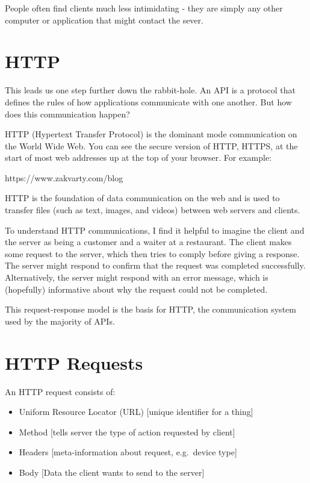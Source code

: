 \documentclass[
  12pt,
]{book}
\newenvironment{Shaded}{\begin{snugshade}}{\end{snugshade}}
\newcommand{\NormalTok}[1]{#1}
\providecommand{\tightlist}{%
  \setlength{\itemsep}{0pt}\setlength{\parskip}{0pt}}
\begin{document}
People often find clients much less intimidating - they are simply any other computer or application that might contact the sever.

\hypertarget{http}{%
\section{HTTP}\label{http}}

This leads us one step further down the rabbit-hole. An API is a protocol that defines the rules of how applications communicate with one another. But how does this communication happen?

HTTP (Hypertext Transfer Protocol) is the dominant mode communication on the World Wide Web. You can see the secure version of HTTP, HTTPS, at the start of most web addresses up at the top of your browser. For example:

\begin{Shaded}
\begin{Highlighting}[]
\NormalTok{https://www.zakvarty.com/blog}
\end{Highlighting}
\end{Shaded}

HTTP is the foundation of data communication on the web and is used to transfer files (such as text, images, and videos) between web servers and clients.

To understand HTTP communications, I find it helpful to imagine the client and the server as being a customer and a waiter at a restaurant. The client makes some request to the server, which then tries to comply before giving a response. The server might respond to confirm that the request was completed successfully. Alternatively, the server might respond with an error message, which is (hopefully) informative about why the request could not be completed.

This request-response model is the basis for HTTP, the communication system used by the majority of APIs.

\hypertarget{http-requests}{%
\section{HTTP Requests}\label{http-requests}}

An HTTP request consists of:

\begin{itemize}
\tightlist
\item
  Uniform Resource Locator (URL) {[}unique identifier for a thing{]}
\item
  Method {[}tells server the type of action requested by client{]}
\item
  Headers {[}meta-information about request, e.g.~device type{]}
\item
  Body {[}Data the client wants to send to the server{]}
\end{itemize}
\end{document}
